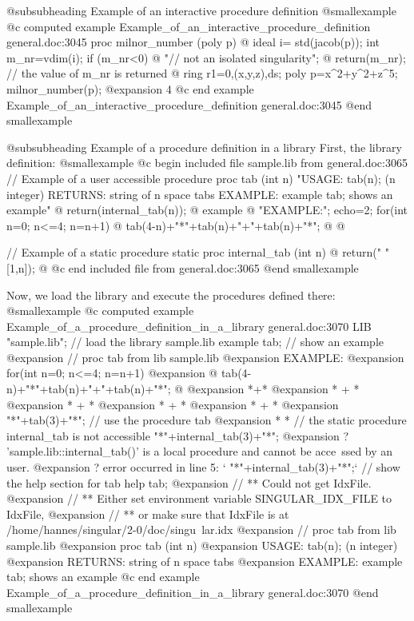 {{{@subsubheading Example of an interactive procedure definition
@smallexample
@c computed example Example_of_an_interactive_procedure_definition general.doc:3045 
  proc milnor_number (poly p)
  @{
    ideal i= std(jacob(p));
    int m_nr=vdim(i);
    if (m_nr<0)
    @{
      "// not an isolated singularity";
    @}
    return(m_nr);         // the value of m_nr is returned
  @}
  ring r1=0,(x,y,z),ds;
  poly p=x^2+y^2+z^5;
  milnor_number(p);
@expansion{} 4
@c end example Example_of_an_interactive_procedure_definition general.doc:3045
@end smallexample

@subsubheading Example of a procedure definition in a library
First, the library definition:
@smallexample
@c begin included file sample.lib from general.doc:3065
// Example of a user accessible procedure
proc tab (int n)
"USAGE:    tab(n);  (n integer)
RETURNS:  string of n space tabs
EXAMPLE:  example tab; shows an example"
@{ return(internal_tab(n)); @}
example
@{
  "EXAMPLE:"; echo=2;
  for(int n=0; n<=4; n=n+1)
  @{ tab(4-n)+"*"+tab(n)+"+"+tab(n)+"*"; @}
@}

// Example of a static procedure
static proc internal_tab (int n)
@{ return(" "[1,n]); @}
@c end included file from general.doc:3065
@end smallexample

Now, we load the library and execute the procedures defined there:
@smallexample
@c computed example Example_of_a_procedure_definition_in_a_library general.doc:3070 
  LIB "sample.lib";        // load the library sample.lib
  example tab;             // show an example
@expansion{} // proc tab from lib sample.lib
@expansion{} EXAMPLE:
@expansion{}   for(int n=0; n<=4; n=n+1)
@expansion{}   @{ tab(4-n)+"*"+tab(n)+"+"+tab(n)+"*"; @}
@expansion{}     *+*
@expansion{}    * + *
@expansion{}   *  +  *
@expansion{}  *   +   *
@expansion{} *    +    *
@expansion{} 
  "*"+tab(3)+"*";          // use the procedure tab
@expansion{} *   *
  // the static procedure internal_tab is not accessible
  "*"+internal_tab(3)+"*";
@expansion{}    ? 'sample.lib::internal_tab()' is a local procedure and cannot be acce\
   ssed by an user.
@expansion{}    ? error occurred in line 5: `  "*"+internal_tab(3)+"*";`
  // show the help section for tab
  help tab;
@expansion{} // ** Could not get IdxFile. 
@expansion{} // ** Either set environment variable SINGULAR_IDX_FILE to IdxFile,
@expansion{} // ** or make sure that IdxFile is at /home/hannes/singular/2-0/doc/singu\
   lar.idx
@expansion{} // proc tab from lib sample.lib
@expansion{} proc tab (int n)
@expansion{} USAGE:    tab(n);  (n integer)
@expansion{} RETURNS:  string of n space tabs
@expansion{} EXAMPLE:  example tab; shows an example
@c end example Example_of_a_procedure_definition_in_a_library general.doc:3070
@end smallexample

}}}

